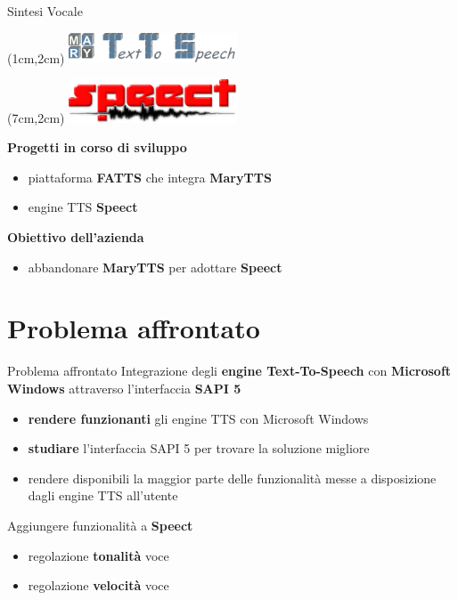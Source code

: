 \documentclass{beamer}
\begin{document}
	\begin{frame}{Sintesi Vocale}
		\begin{textblock*}{5cm}(1cm,2cm) %
			\includegraphics[width=5cm]{images/marylogo}
		\end{textblock*}
		\begin{textblock*}{5cm}(7cm,2cm) %
			\includegraphics[width=5cm]{images/speect_logo_full}
		\end{textblock*}
	    \vspace{50pt}
		\textbf{Progetti in corso di sviluppo}
		\begin{itemize}
			\item piattaforma \textbf{FATTS} che integra \textbf{MaryTTS}
			\item engine TTS \textbf{Speect}
		\end{itemize}
		\vspace{10pt}
		\textbf{Obiettivo dell'azienda}
		\begin{itemize}
			\item abbandonare \textbf{MaryTTS} per adottare \textbf{Speect} 
		\end{itemize}
	\end{frame}


	\section{Problema affrontato}

	\begin{frame}{Problema affrontato}
		Integrazione degli \textbf{engine Text-To-Speech} con \textbf{Microsoft Windows} attraverso l'interfaccia \textbf{SAPI 5}
		\begin{itemize}
		\item \textbf{rendere funzionanti} gli engine TTS con Microsoft Windows
		\item \textbf{studiare} l'interfaccia SAPI 5 per trovare la soluzione migliore
		\item rendere disponibili la maggior parte delle funzionalità messe a disposizione dagli engine TTS all'utente
		\end{itemize}
		\vspace{10pt}
		Aggiungere funzionalità a \textbf{Speect}
		\begin{itemize}
			\item regolazione \textbf{tonalità} voce
			\item regolazione \textbf{velocità} voce
		\end{itemize}
	\end{frame}
\end{document}
